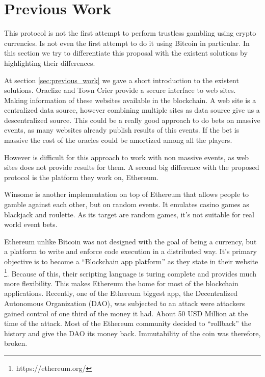 \section{Previous Work} \label{sec:discussion_previous_work}

This protocol is not the first attempt to perform trustless gambling using
  crypto currencies.
Is not even the first attempt to do it using Bitcoin in particular.
In this section we try to differentiate this proposal with the existent
  solutions by highlighting their differences.

At section \ref{sec:previous_work} we gave a short introduction to the existent
  solutions.
Oraclize and Town Crier provide a secure interface to web sites.
Making information of these websites available in the blockchain.
A web site is a centralized data source, however combining multiple sites as
  data source give us a descentralized source.
This could be a really good approach to do bets on massive events, as
  many websites already publish results of this events.
If the bet is massive the cost of the oracles could be amortized among
  all the players.

However is difficult for this approach to work with non massive events, as
  web sites does not provide results for them.
A second big difference with the proposed protocol is the platform they work
  on, Ethereum.

Winsome is another implementation on top of Ethereum that allows people to
  gamble against each other, but on random events.
It emulates casino games as blackjack and roulette.
As its target are random games, it's not suitable for real world event bets.

Ethereum unlike Bitcoin was not designed with the goal of being a currency,
  but a platform to write and enforce code execution in a distributed
  way.
It's primary objective is to become a ``Blockchain app platform'' as they
  state in their website \footnote{https://ethereum.org/}.
Because of this, their scripting language is turing complete and provides much
  more flexibility.
This makes Ethereum the home for most of the blockchain applications.
Recently, one of the Ethereum biggest app, the Decentralized Autonomous
  Organization (DAO), was subjected to an attack were attackers gained control
  of one third of the money it had.
About 50 USD Million at the time of the attack.
Most of the Ethereum community decided to ``rollback'' the history and give the
  DAO its money back.
Immutability of the coin was therefore, broken.

